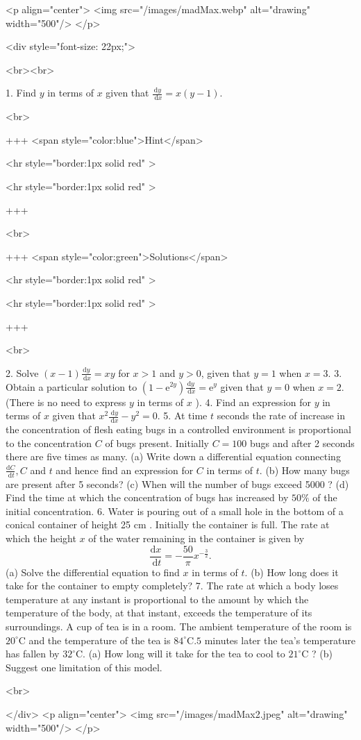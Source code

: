 <p align="center">
<img src="/images/madMax.webp" alt="drawing" width="500"/>
</p>

<div style="font-size: 22px;">

<br><br>

1. Find $y$ in terms of $x$ given that $\frac{\mathrm{d} y}{\mathrm{~d} x}=x(y-1)$.

<br>

+++ <span style="color:blue">Hint</span>

<hr style="border:1px solid red" >

<hr style="border:1px solid red" >

+++

<br>

+++ <span style="color:green">Solutions</span>

<hr style="border:1px solid red" >

<hr style="border:1px solid red" >

+++

<br>

2. Solve $(x-1) \frac{\mathrm{d} y}{\mathrm{~d} x}=x y$ for $x>1$ and $y>0$, given that $y=1$ when $x=3$.
3. Obtain a particular solution to $\left(1-\mathrm{e}^{2 y}\right) \frac{\mathrm{d} y}{\mathrm{~d} x}=\mathrm{e}^{y}$ given that $y=0$ when $x=2$.
(There is no need to express $y$ in terms of $x$ ).
4. Find an expression for $y$ in terms of $x$ given that $x^{2} \frac{\mathrm{~d} y}{\mathrm{~d} x}-y^{2}=0$.
5. At time $t$ seconds the rate of increase in the concentration of flesh eating bugs in a controlled environment is proportional to the concentration $C$ of bugs present. Initially $C=100$ bugs and after 2 seconds there are five times as many.
(a) Write down a differential equation connecting $\frac{\mathrm{d} C}{\mathrm{~d} t}, C$ and $t$ and hence find an expression for $C$ in terms of $t$.
(b) How many bugs are present after 5 seconds?
(c) When will the number of bugs exceed 5000 ?
(d) Find the time at which the concentration of bugs has increased by $50 \%$ of the initial concentration.
6. Water is pouring out of a small hole in the bottom of a conical container of height 25 cm . Initially the container is full.
The rate at which the height $x$ of the water remaining in the container is given by
$$
\frac{\mathrm{d} x}{\mathrm{~d} t}=-\frac{50}{\pi} x^{-\frac{3}{2}} .
$$
(a) Solve the differential equation to find $x$ in terms of $t$.
(b) How long does it take for the container to empty completely?
7. The rate at which a body loses temperature at any instant is proportional to the amount by which the temperature of the body, at that instant, exceeds the temperature of its surroundings.
A cup of tea is in a room. The ambient temperature of the room is $20^{\circ} \mathrm{C}$ and the temperature of the tea is $84^{\circ} \mathrm{C} .5$ minutes later the tea's temperature has fallen by $32^{\circ} \mathrm{C}$.
(a) How long will it take for the tea to cool to $21^{\circ} \mathrm{C}$ ?
(b) Suggest one limitation of this model.

<br>

</div>
<p align="center">
<img src="/images/madMax2.jpeg" alt="drawing" width="500"/>
</p>
